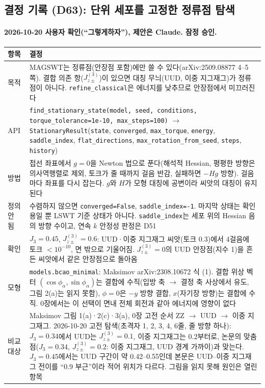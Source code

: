 \subsection{결정 기록 (D63): 단위 세포를 고정한 정류점 탐색}\label{decisions-d63-stationary}
\begingroup%
  \framesubtitle{2026-10-20 사용자 확인(``그렇게하자''), 제안은 Claude. 잠정 승인.}
  \small\renewcommand{\arraystretch}{1.12}
  \begin{tabularx}{\textwidth}{@{}P{3.0cm}Y@{}}
    \toprule
    항목 & 결정 \\
    \midrule
    목적 & MAGSWT는 정류점(안장점 포함)에만 쓸 수 있다(arXiv:2509.08877 4--5쪽). 결합 의존 항($J^{(3)}_{z\pm}$)이 있으면 대칭 무늬(UUD, 이중 지그재그)가 정류점이 아니다. \texttt{refine\_classical}은 에너지를 낮추므로 안장점에서 미끄러진다 \\
    API & \texttt{find\_stationary\_state(model, seed, conditions, torque\_tolerance=1e-10, max\_steps=100)} $\to$ \texttt{StationaryResult}(\texttt{state}, \texttt{converged}, \texttt{max\_torque}, \texttt{energy}, \texttt{saddle\_index}, \texttt{flat\_directions}, \texttt{max\_rotation\_from\_seed}, \texttt{steps}, \texttt{history}) \\
    방법 & 접선 좌표에서 $g=0$을 Newton 법으로 푼다(해석적 Hessian, 평평한 방향은 의사역행렬로 제외, 토크가 줄 때까지 걸음 반감, 실패하면 $-Hg$ 방향). 걸음마다 좌표를 다시 잡는다. $g$와 $H$가 모형 대칭에 공변이라 씨앗의 대칭이 유지된다 \\
    정의 안 됨 & 수렴하지 않으면 \texttt{converged=False}, \texttt{saddle\_index=-1}. 마지막 상태는 확인용일 뿐 LSWT 기준 상태가 아니다. \texttt{saddle\_index}는 세포 위의 Hessian 음의 방향 수이고, 연속 $k$ 안정성 판정은 D51 \\
    확인 & $J_3=0.45$, $J^{(3)}_{z\pm}=0.6$: UUD·이중 지그재그 씨앗(토크 0.3)에서 4걸음에 토크 $<10^{-10}$, 면 밖으로 기울어짐. $J^{(3)}_{z\pm}=0$의 UUD 안장점(지수 1)을 흔든 씨앗에서 같은 안장점으로 돌아옴 \\
    모형 & \texttt{models.bcao\_minimal}: Maksimov arXiv:2308.10672 식 (1). 결합 위상 벡터 $(\cos\phi_\alpha,\sin\phi_\alpha)$는 결합에 수직(입방 축 $\to$ 결정 축 사상에서 유도, 그림 2(a)는 읽지 못함), $\phi=0$은 $-y$ 방향 결합, $x$(자기장 방향)는 결합에 수직. 0장에서는 이 선택이 면내 전체 회전과 같아 에너지에 영향이 없다 \\
    비교 대상 & Maksimov 그림 1(a)·2(c)·3(a), 0장 고전 순서 ZZ $\to$ UUD $\to$ 이중 지그재그. 2026-10-20 고전 탐색(초격자 1, 2, 3, 4, 6줄, 줄 방향 하나): $J_3=0.34$에서 UUD는 $J^{(3)}_{z\pm}=0.1$, 이중 지그재그는 0.2부터로, 논문의 맞춤 점($J_3=0.34$, $J^{(3)}_{z\pm}=0.2$: 이중 지그재그, UUD 경계 가까이)과 맞는다. $J_3=0.45$에서는 UUD 구간이 약 0.42--0.55인데 본문은 UUD--이중 지그재그 전이를 ``0.9 부근''이라 적어 위치가 다르다. 그림을 읽지 못해 원인은 열린 항목 \\
    \bottomrule
  \end{tabularx}
\endgroup

